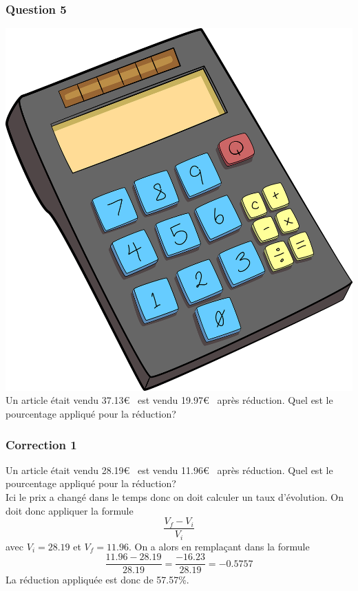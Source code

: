 \documentclass[15pt, mathserif]{beamer}
\begin{document}
\begin{frame} 
	\frametitle{Question 5}
\includegraphics[scale=0.01]{calculatrice}Un article était vendu 37.13\euro ~ est vendu 19.97\euro ~ après réduction. Quel est le pourcentage appliqué pour la réduction? \end{frame}


\begin{frame}
\vspace{-10mm}
	\frametitle{Correction 1}
Un article était vendu 28.19\euro ~ est vendu 11.96\euro ~ après réduction. Quel est le pourcentage appliqué pour la réduction? \\ Ici le prix a changé dans le temps donc on doit calculer un taux d'évolution. On doit donc appliquer la formule $$\dfrac{V_f-V_i}{V_i}$$ avec $V_i =28.19$ et $V_f=11.96$. On a alors en remplaçant dans la formule $$\dfrac{11.96-28.19}{28.19}= \dfrac{-16.23}{28.19}=-0.5757$$ La réduction appliquée est donc de 57.57\%.\end{frame}
\end{document}
